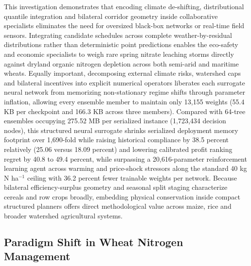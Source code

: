 \documentclass[11pt,a4paper]{article}
\begin{document}
This investigation demonstrates that encoding climate de-shifting, distributional quantile integration and bilateral corridor geometry inside collaborative specialists eliminates the need for oversized black-box networks or real-time field sensors. Integrating candidate schedules across complete weather-by-residual distributions rather than deterministic point predictions enables the eco-safety and economic specialists to weigh rare spring nitrate leaching storms directly against dryland organic nitrogen depletion across both semi-arid and maritime wheats. Equally important, decomposing external climate risks, watershed caps and bilateral incentives into explicit numerical operators liberates each surrogate neural network from memorizing non-stationary regime shifts through parameter inflation, allowing every ensemble member to maintain only 13,155 weights (55.4 KB per checkpoint and 166.3 KB across three members). Compared with 64-tree ensembles occupying 275.52 MB per serialized instance (1,723,434 decision nodes), this structured neural surrogate shrinks serialized deployment memory footprint over 1,690-fold while raising historical compliance by 38.5 percent relatively (25.06 versus 18.09 percent) and lowering calibrated profit ranking regret by 40.8 to 49.4 percent, while surpassing a 20,616-parameter reinforcement learning agent across warming and price-shock stressors along the standard 40 kg N ha$^{-1}$ ceiling with 36.2 percent fewer trainable weights per network. Because bilateral efficiency-surplus geometry and seasonal split staging characterize cereals and row crops broadly, embedding physical conservation inside compact structured planners offers direct methodological value across maize, rice and broader watershed agricultural systems.

\subsection{Paradigm Shift in Wheat Nitrogen Management}
\end{document}
